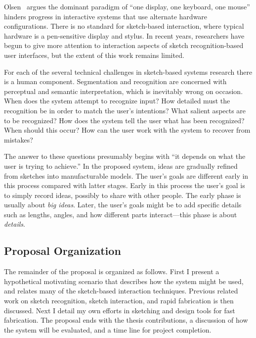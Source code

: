 \documentclass[12pt]{article}
\begin{document}
Olsen~\cite{olsen-ui-research} argues the dominant paradigm of ``one
display, one keyboard, one mouse'' hinders progress in interactive
systems that use alternate hardware configurations. There is no
standard for sketch-based interaction, where typical hardware is a
pen-sensitive display and stylus. In recent years, researchers have
begun to give more attention to interaction aspects of sketch
recognition-based user interfaces, but the extent of this work remains
limited.

For each of the several technical challenges in sketch-based systems
research there is a human component. Segmentation and recognition are
concerned with perceptual and semantic interpretation, which is
inevitably wrong on occasion. When does the system attempt to
recognize input? How detailed must the recognition be in order to
match the user's intentions? What salient aspects are to be
recognized? How does the system tell the user what has been
recognized? When should this occur? How can the user work with the
system to recover from mistakes?

The answer to these questions presumably begins with ``it depends on
what the user is trying to achieve.'' In the proposed system, ideas
are gradually refined from sketches into manufacturable models. The
user's goals are different early in this process compared with latter
stages. Early in this process the user's goal is to simply record
ideas, possibly to share with other people. The early phase is usually
about \textit{big ideas}. Later, the user's goals might be to add
specific details such as lengths, angles, and how different parts
interact---this phase is about \textit{details}.

\subsection{Proposal Organization}

The remainder of the proposal is organized as follows. First I present
a hypothetical motivating scenario that describes how the system might
be used, and relates many of the sketch-based interaction
techniques. Previous related work on sketch recognition, sketch
interaction, and rapid fabrication is then discussed. Next I detail my
own efforts in sketching and design tools for fast fabrication. The
proposal ends with the thesis contributions, a discussion of how the
system will be evaluated, and a time line for project completion.
\end{document}
